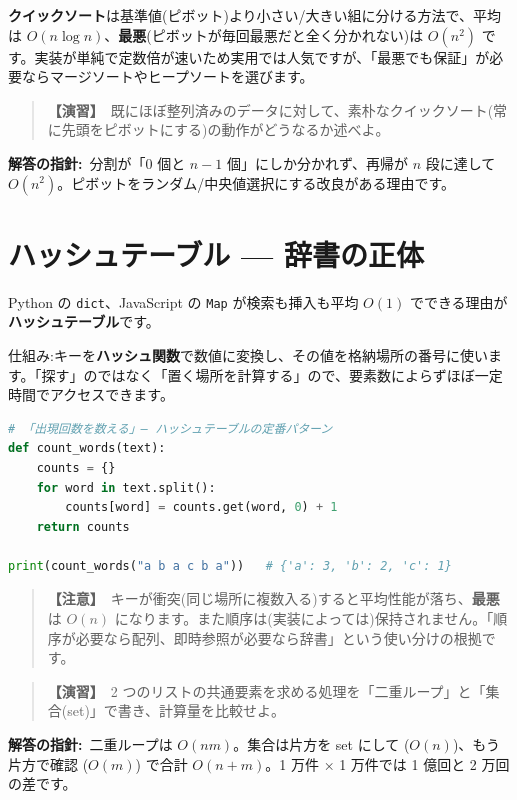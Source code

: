 \documentclass{article}
\begin{document}
\textbf{クイックソート}は基準値(ピボット)より小さい/大きい組に分ける方法で、平均は \(O(n \log n)\)、\textbf{最悪}(ピボットが毎回最悪だと全く分かれない)は \(O(n^2)\) です。実装が単純で定数倍が速いため実用では人気ですが、「最悪でも保証」が必要ならマージソートやヒープソートを選びます。

\begin{quote}
\textbf{【演習】}\ 既にほぼ整列済みのデータに対して、素朴なクイックソート(常に先頭をピボットにする)の動作がどうなるか述べよ。
\end{quote}

\textbf{解答の指針:}\ 分割が「0 個と \(n-1\) 個」にしか分かれず、再帰が \(n\) 段に達して \(O(n^2)\)。ピボットをランダム/中央値選択にする改良がある理由です。

\section{ハッシュテーブル — 辞書の正体}

Python の \texttt{dict}、JavaScript の \texttt{Map} が検索も挿入も平均 \(O(1)\) でできる理由が\textbf{ハッシュテーブル}です。

仕組み:キーを\textbf{ハッシュ関数}で数値に変換し、その値を格納場所の番号に使います。「探す」のではなく「置く場所を計算する」ので、要素数によらずほぼ一定時間でアクセスできます。

\begin{lstlisting}[language=Python]
# 「出現回数を数える」— ハッシュテーブルの定番パターン
def count_words(text):
    counts = {}
    for word in text.split():
        counts[word] = counts.get(word, 0) + 1
    return counts

print(count_words("a b a c b a"))   # {'a': 3, 'b': 2, 'c': 1}
\end{lstlisting}

\begin{quote}
\textbf{【注意】}\ キーが衝突(同じ場所に複数入る)すると平均性能が落ち、\textbf{最悪}は \(O(n)\) になります。また順序は(実装によっては)保持されません。「順序が必要なら配列、即時参照が必要なら辞書」という使い分けの根拠です。
\end{quote}

\begin{quote}
\textbf{【演習】}\ 2 つのリストの共通要素を求める処理を「二重ループ」と「集合(set)」で書き、計算量を比較せよ。
\end{quote}

\textbf{解答の指針:}\ 二重ループは \(O(nm)\)。集合は片方を set にして (\(O(n)\))、もう片方で確認 (\(O(m)\)) で合計 \(O(n+m)\)。1 万件 × 1 万件では 1 億回と 2 万回の差です。
\end{document}
